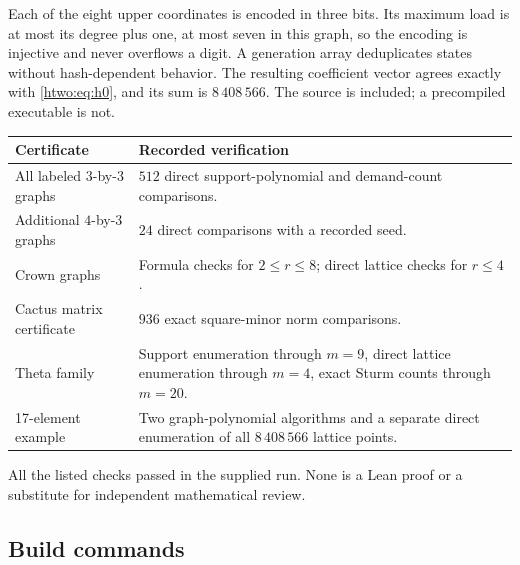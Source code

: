 \documentclass[11pt]{article}
\numberwithin{equation}{section}
\theoremstyle{definition}
\begin{document}
Each of the eight upper coordinates is encoded in three bits. Its
maximum load is at most its degree plus one, at most seven in this graph,
so the encoding is injective and never overflows a digit. A generation
array deduplicates states without hash-dependent behavior. The resulting
coefficient vector agrees exactly with \eqref{htwo:eq:h0}, and its sum is
$8\,408\,566$. The source is included; a precompiled executable is not.

\begin{center}
\small
\begin{tabularx}{\textwidth}{@{}p{}Y@{}}
\toprule
Certificate & Recorded verification\\
\midrule
All labeled $3$-by-$3$ graphs & $512$ direct support-polynomial and demand-count comparisons.\\
Additional $4$-by-$3$ graphs & $24$ direct comparisons with a recorded seed.\\
Crown graphs & Formula checks for $2\le r\le8$; direct lattice checks for $r\le4$.\\
Cactus matrix certificate & $936$ exact square-minor norm comparisons.\\
Theta family & Support enumeration through $m=9$, direct lattice enumeration through
$m=4$, exact Sturm counts through $m=20$.\\
17-element example & Two graph-polynomial algorithms and a separate direct enumeration
of all $8\,408\,566$ lattice points.\\
\bottomrule
\end{tabularx}
\end{center}
All the listed checks passed in the supplied run. None is a Lean proof
or a substitute for independent mathematical review.

\subsection{Build commands}
\label{htwo:sec:build}
\end{document}
